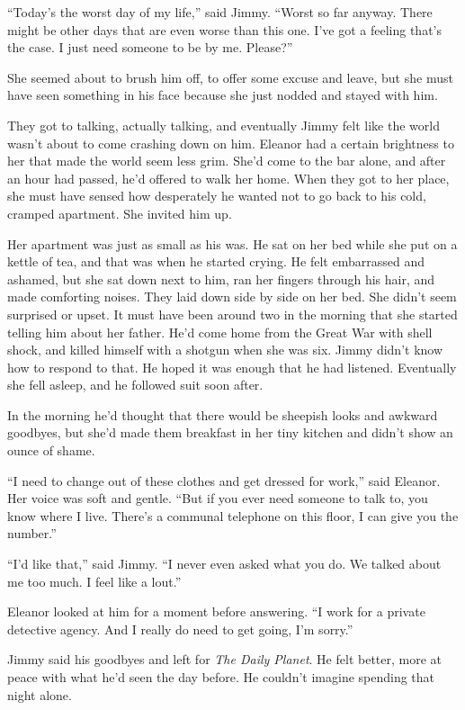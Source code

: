 \documentclass[ebook,12pt]{memoir}
\begin{document}
``Today's the worst day of my life,'' said Jimmy. ``Worst so far anyway.
There might be other days that are even worse than this one. I've got a
feeling that's the case. I just need someone to be by me. Please?''

She seemed about to brush him off, to offer some excuse and leave, but
she must have seen something in his face because she just nodded and
stayed with him.

They got to talking, actually talking, and eventually Jimmy felt like
the world wasn't about to come crashing down on him. Eleanor had a
certain brightness to her that made the world seem less grim. She'd come
to the bar alone, and after an hour had passed, he'd offered to walk her
home. When they got to her place, she must have sensed how desperately
he wanted not to go back to his cold, cramped apartment. She invited him
up.

Her apartment was just as small as his was. He sat on her bed while she
put on a kettle of tea, and that was when he started crying. He felt
embarrassed and ashamed, but she sat down next to him, ran her fingers
through his hair, and made comforting noises. They laid down side by
side on her bed. She didn't seem surprised or upset. It must have been
around two in the morning that she started telling him about her father.
He'd come home from the Great War with shell shock, and killed himself
with a shotgun when she was six. Jimmy didn't know how to respond to
that. He hoped it was enough that he had listened. Eventually she fell
asleep, and he followed suit soon after.

In the morning he'd thought that there would be sheepish looks and
awkward goodbyes, but she'd made them breakfast in her tiny kitchen and
didn't show an ounce of shame.

``I need to change out of these clothes and get dressed for work,'' said
Eleanor. Her voice was soft and gentle. ``But if you ever need someone
to talk to, you know where I live. There's a communal telephone on this
floor, I can give you the number.''

``I'd like that,'' said Jimmy. ``I never even asked what you do. We
talked about me too much. I feel like a lout.''

Eleanor looked at him for a moment before answering. ``I work for a
private detective agency. And I really do need to get going, I'm
sorry.''

Jimmy said his goodbyes and left for \emph{The Daily Planet}. He felt
better, more at peace with what he'd seen the day before. He couldn't
imagine spending that night alone.
\end{document}
